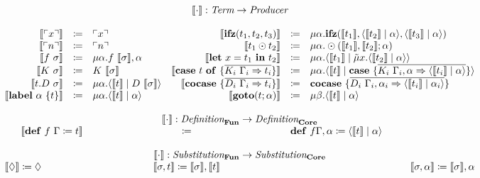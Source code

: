 \[
  \begin{array}{rcl rcl}
    \multicolumn{6}{c}{\translate{\cdot} : \emph{Term} \rightarrow \emph{Producer}}\\
    \\
    \translate{\lit{x}} & \coloneq & \lit{x} & 
    \translate{\ifz{t_1}{t_2}{t_3}} & \coloneq & \mu\alpha.\ifz{\translate{t_1}}{\cut{\translate{t_2}}{\alpha}}{\cut{\translate{t_3}}{\alpha}} \\
    \translate{\lit{n}} & \coloneq & \lit{n}  &  
    \translate{t_1 \odot t_2} & \coloneq & \mu\alpha.\odot(\translate{t_1}, \translate{t_2}; \alpha)  \\
    \translate{f\ \sigma} & \coloneq & \mu\alpha.f\ \translate{\sigma}, \alpha  & 
    \translate{\letin{x}{t_1}{t_2}} & \coloneq & \mu\alpha.\cut{\translate{t_1}}{\tilde{\mu}x.\cut{\translate{t_2}}{\alpha}} \\
    \translate{K\ \sigma} & \coloneq & K\ \translate{\sigma} &  
    \translate{\caseof{t}{\overline{K_i\ \Gamma_i \Rightarrow t_i}}} & \coloneq & \mu\alpha.\cut{\translate{t}}{\case{\overline{K_i\ \Gamma_i,\alpha \Rightarrow \cut{\translate{t_i}}{\alpha}}}}  \\
    \translate{t.D\ \sigma} & \coloneq & \mu\alpha.\cut{\translate{t}}{D\ \translate{\sigma}}   & 
    \translate{\cocase{\overline{D_i\ \Gamma_i \Rightarrow t_i}}} & \coloneq & \cocase{\overline{D_i\ \Gamma_i,\alpha_i \Rightarrow \cut{\translate{t_i}}{\alpha_i}}}  \\
    \translate{\lab{\alpha}{t}} & \coloneq & \mu\alpha.\cut{\translate{t}}{\alpha} & 
    \translate{\goto{t}{\alpha}} & \coloneq & \mu\beta.\cut{\translate{t}}{\alpha}  \\
    \\
    \multicolumn{6}{c}{\translate{\cdot{}}{} : \emph{Definition}_{\surfacelang{}} \rightarrow \emph{Definition}_{\targetlang{}}}\\
    \multicolumn{2}{r}{\translate{\defi{f\ \Gamma}{t}}{}} & \multicolumn{2}{c}{\coloneq} & \multicolumn{2}{l}{\defi{f\Gamma, \alpha}{\cut{\translate{t}}{\alpha}}} \\
    \\ 
    \multicolumn{6}{c}{\translate{\cdot{}}{}:\emph{Substitution}_{\surfacelang{}}\rightarrow\emph{Substitution}_{\targetlang{}}}\\
    \multicolumn{2}{l}{\translate{\nil} \coloneq \nil} & 
    \multicolumn{2}{c}{\translate{\sigma,t} \coloneq \translate{\sigma},\translate{t}} &
    \multicolumn{2}{r}{\translate{\sigma,\alpha} \coloneq \translate{\sigma},\alpha}\\
    \\
  \end{array}
\]
